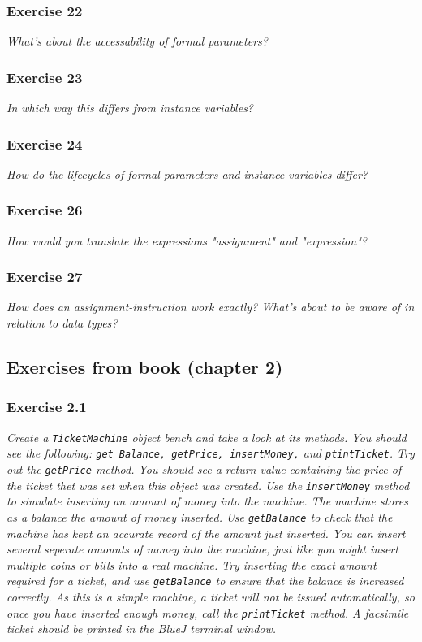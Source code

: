 \subsubsection*{Exercise 22}
\textit{What's about the accessability of formal parameters?}\\

\subsubsection*{Exercise 23}
\textit{In which way this differs from instance variables?}\\

\subsubsection*{Exercise 24}
\textit{How do the lifecycles of formal parameters and instance variables 
	differ?}\\

\subsubsection*{Exercise 26}
\textit{How would you translate the expressions "assignment" and 
	"expression"?}\\

\subsubsection*{Exercise 27}
\textit{How does an assignment-instruction work exactly? What's about to 
	be aware of in relation to data types?}\\

\subsection{Exercises from book (chapter 2)}
\subsubsection*{Exercise 2.1}
\textit{Create a \verb?TicketMachine? object bench and take a look at its 
methods. You should see the following: 
\verb?get Balance, getPrice, insertMoney,? and \verb?ptintTicket?. Try out the 
\verb?getPrice? method. You should see a return value containing the price of 
the ticket thet was set when this object was created. Use the 
\verb?insertMoney? method to simulate inserting an amount of money into the 
machine. The machine stores as a balance the amount of money inserted. Use 
\verb?getBalance? to check that the machine has kept an accurate record of the 
amount just inserted. You can insert several seperate amounts of money into the 
machine, just like you might insert multiple coins or bills into a real 
machine. Try inserting the exact amount required for a ticket, and use 
\verb?getBalance? to ensure that the balance is increased correctly. As this 
is a simple machine, a ticket will not be issued automatically, so once you 
have inserted enough money, call the \verb?printTicket? method. A facsimile 
ticket should be printed in the BlueJ terminal window. }

